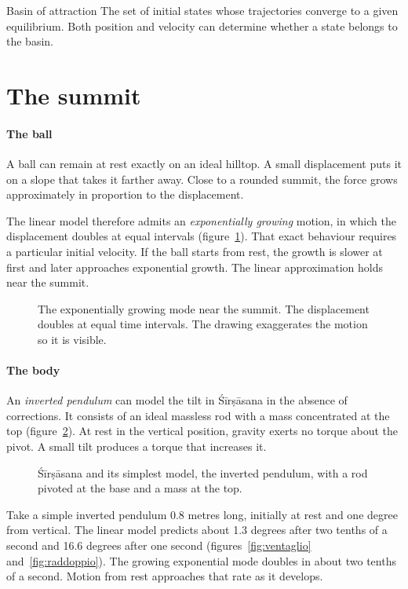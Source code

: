 \begin{parola}{Basin of attraction}
The set of initial states whose trajectories converge to a given equilibrium. Both position and velocity can determine whether a state belongs to the basin.
\end{parola}

\section{The summit}\label{sec:cima}

\paragraph{The ball} A ball can remain at rest exactly on an ideal hilltop. A small displacement puts it on a slope that takes it farther away. Close to a rounded summit, the force grows approximately in proportion to the displacement.

The linear model therefore admits an \emph{exponentially growing} motion, in which the displacement doubles at equal intervals (figure~\ref{fig:collepalline}). That exact behaviour requires a particular initial velocity. If the ball starts from rest, the growth is slower at first and later approaches exponential growth. The linear approximation holds near the summit.

\begin{figure}
\caption{The exponentially growing mode near the summit. The displacement doubles at equal time intervals. The drawing exaggerates the motion so it is visible.}
\label{fig:collepalline}
\end{figure}

\paragraph{The body} An \emph{inverted pendulum} can model the tilt in Śīrṣāsana in the absence of corrections. It consists of an ideal massless rod with a mass concentrated at the top (figure~\ref{fig:pendolonudo}). At rest in the vertical position, gravity exerts no torque about the pivot. A small tilt produces a torque that increases it.

\begin{figure}
\caption{Śīrṣāsana and its simplest model, the inverted pendulum, with a rod pivoted at the base and a mass at the top.}
\label{fig:pendolonudo}
\end{figure}

Take a simple inverted pendulum 0.8 metres long, initially at rest and one degree from vertical. The linear model predicts about 1.3 degrees after two tenths of a second and 16.6 degrees after one second (figures~\ref{fig:ventaglio} and~\ref{fig:raddoppio}). The growing exponential mode doubles in about two tenths of a second. Motion from rest approaches that rate as it develops.

